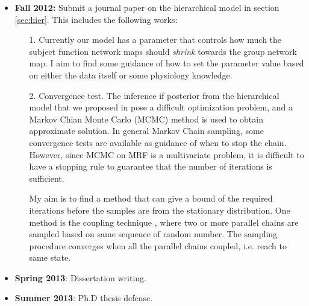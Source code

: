 \documentclass[12pt]{article}
\begin{document}
\begin{itemize}
  \item \textbf{Fall 2012:} Submit a journal paper on the hierarchical model in section \ref{sec:hier}. This includes the following works:
    \begin{itemize}
      \item [1.] Currently our model has a parameter that controls how much the
        subject function network maps should \emph{shrink} towards the group
        network map. I aim to find some guidance of how to set the parameter
        value based on either the data itself or some physiology knowledge.
        
      \item [2.] Convergence test. The inference if posterior from the
        hierarchical model that we proposed in \cite{Liu2012a} pose a difficult
        optimization problem, and a Markov Chian Monte Carlo (MCMC) method is
        used to obtain approximate solution. In general Markov Chain sampling,
        some convergence tests are available \cite{cowles1996markov} as guidance
        of when to stop the chain. However, since MCMC on MRF is a multivariate
        problem, it is difficult to have a stopping rule to guarantee that the
        number of iterations is sufficient. 

        My aim is to find a method that can give a bound of the required
        iterations before the samples are from the stationary distribution. One
        method is the coupling technique
        \cite{haggstrom1999exact,propp1996exact}, where two or more parallel
        chains are sampled based on same sequence of random number. The sampling
        procedure converges when all the parallel chains coupled, i.e. reach to
        same state.


    \end{itemize}
  \item \textbf{Spring 2013}: Dissertation writing.
  \item \textbf{Summer 2013}: Ph.D thesis defense.
\end{itemize}




\end{document}
